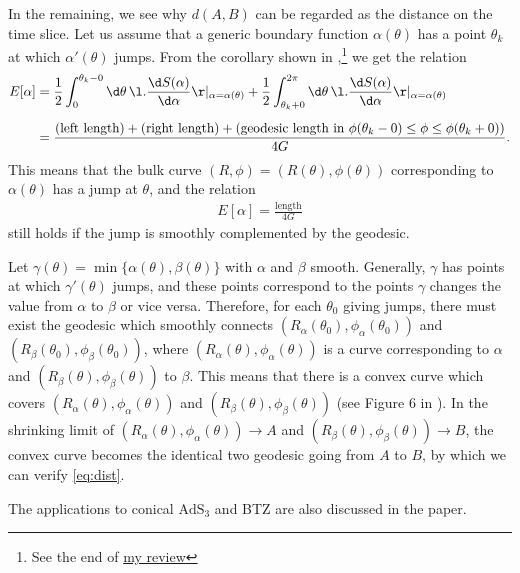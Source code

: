 \documentclass[12pt]{article}
\begin{document}
In the remaining, we see why $d(A,B)$ can be regarded as the distance on the time slice.
Let us assume that a generic boundary function $\alpha(\theta)$ has a point $\theta_k$ at which $\alpha'(\theta)$ jumps.
From the corollary shown in \cite{Balasubramanian:2013lsa},\footnote{
See the end of \href{https://albertmcc.github.io/web/reviews/Hole_ographic_spacetime.pdf}{\color{blue}my review}}
we get the relation
\begin{align}
	E[\alpha] &= \frac{1}{2}\int_{0}^{\theta_k-0}\d\theta\,\l.\frac{\d S(\alpha)}{\d \alpha}\r|_{\alpha = \alpha(\theta)} + \frac{1}{2}\int_{\theta_k+0}^{2\pi}\d\theta\,\l.\frac{\d S(\alpha)}{\d \alpha}\r|_{\alpha = \alpha(\theta)}\nonumber\\[2mm]
	&= \frac{(\mbox{left length}) + (\mbox{right length}) + (\mbox{geodesic length in } \phi(\theta_k-0)\leq \phi\leq \phi(\theta_k+0))}{4G}.
\end{align}
This means that the bulk curve $(R,\phi) = (R(\theta),\phi(\theta))$ corresponding to $\alpha(\theta)$ has a jump at $\theta$, and the relation
\begin{align}
	E[\alpha] = \frac{\mbox{length}}{4G}
\end{align}
still holds if the jump is smoothly complemented by the geodesic.

Let $\gamma(\theta) = \min\{\alpha(\theta),\beta(\theta)\}$ with $\alpha$ and $\beta$ smooth.
Generally, $\gamma$ has points at which $\gamma'(\theta)$ jumps, and these points correspond to the points $\gamma$ changes the value from $\alpha$ to $\beta$ or vice versa.
Therefore, for each $\theta_0$ giving jumps, there must exist the geodesic which smoothly connects $(R_\alpha(\theta_0),\phi_\alpha(\theta_0))$ and $(R_\beta(\theta_0),\phi_\beta(\theta_0))$, where $(R_\alpha(\theta),\phi_\alpha(\theta))$ is a curve corresponding to $\alpha$ and $(R_\beta(\theta),\phi_\beta(\theta))$ to $\beta$.
This means that there is a convex curve which covers $(R_\alpha(\theta),\phi_\alpha(\theta))$ and $(R_\beta(\theta),\phi_\beta(\theta))$ (see Figure 6 in \cite{Czech:2014ppa}).
In the shrinking limit of $(R_\alpha(\theta),\phi_\alpha(\theta))\to A$ and $(R_\beta(\theta),\phi_\beta(\theta))\to B$, the convex curve becomes the identical two geodesic going from $A$ to $B$, by which we can verify \eqref{eq:dist}.

The applications to conical $\mathrm{AdS}_3$ and BTZ are also discussed in the paper.












 

\end{document}
